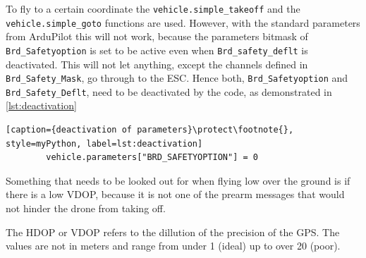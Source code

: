 \documentclass[svgnames]{article}
\begin{document}
	To fly to a certain coordinate the \lstinline|vehicle.simple_takeoff| and the \lstinline|vehicle.simple_goto| functions are used. However, with the standard parameters from ArduPilot this will not work, because the parameters bitmask of  \lstinline|Brd_Safetyoption| is set to be active even when \lstinline|Brd_safety_deflt| is deactivated. 
	This will not let anything, except the channels defined in \lstinline|Brd_Safety_Mask|, go through to the \gls{ESC}. Hence both, \lstinline|Brd_Safetyoption| and \lstinline|Brd_Safety_Deflt|, need to be deactivated by the code, as demonstrated in \cref{lst:deactivation}
	\begin{lstlisting}[caption={deactivation of parameters}\protect\footnote{}, style=myPython, label=lst:deactivation]
		vehicle.parameters["BRD_SAFETYOPTION"] = 0
	\end{lstlisting}
	
	Something that needs to be looked out for when flying low over the ground is if there is a low \gls{VDOP}, because it is not one of the prearm messages that would not hinder the drone from taking off. 
	
	\begin{Explanation}
		\item The \gls{HDOP} or \gls{VDOP} refers to the dillution of the precision of the \gls{GPS}. The values are not in meters and range from under 1 (ideal) up to over 20 (poor). 
	\end{Explanation}
	
\end{document}
